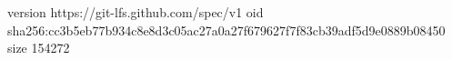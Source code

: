 version https://git-lfs.github.com/spec/v1
oid sha256:cc3b5eb77b934c8e8d3c05ac27a0a27f679627f7f83cb39adf5d9e0889b08450
size 154272
